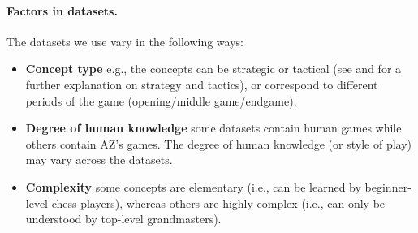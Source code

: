 \documentclass{article}
\begin{document}
\paragraph{Factors in datasets.} The datasets we use vary in the following ways:
\begin{itemize}
    \item \textbf{Concept type} e.g., the concepts can be strategic or tactical (see \cite{wiki:chess_strategy} and \cite{wiki:chess_tactic} for a further explanation on strategy and tactics), or correspond to different periods of the game (opening/middle game/endgame). 
    \item \textbf{Degree of human knowledge} some datasets contain human games while others contain AZ's games. The degree of human knowledge (or style of play) may vary across the datasets.
    \item \textbf{Complexity} some concepts are elementary (i.e., can be learned by beginner-level chess players), whereas others are highly complex (i.e., can only be understood by top-level grandmasters).
\end{itemize}
\end{document}
